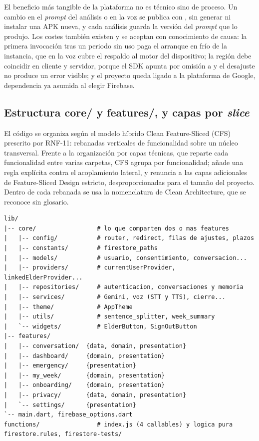 El beneficio más tangible de la plataforma no es técnico sino de proceso. Un cambio en el \emph{prompt} del
análisis o en la voz se publica con , sin generar ni instalar una APK nueva, y cada
análisis guarda la versión del \emph{prompt} que lo produjo. Los costes también existen y se aceptan con
conocimiento de causa: la primera invocación tras un periodo sin uso paga el arranque en frío de la
instancia, que en la voz cubre el respaldo al motor del dispositivo; la región debe coincidir en cliente y
servidor, porque el SDK apunta por omisión a  y el desajuste no produce un error visible;
y el proyecto queda ligado a la plataforma de Google, dependencia ya asumida al elegir Firebase.

\subsection{Estructura core/ y features/, y capas por \emph{slice}}

El código se organiza según el modelo híbrido Clean Feature-Sliced (CFS) prescrito por RNF-11: rebanadas
verticales de funcionalidad sobre un núcleo transversal. Frente a la organización por capas técnicas, que
reparte cada funcionalidad entre varias carpetas, CFS agrupa por funcionalidad; añade una regla explícita
contra el acoplamiento lateral, y renuncia a las capas adicionales de Feature-Sliced Design estricto,
desproporcionadas para el tamaño del proyecto. Dentro de cada rebanada se usa la nomenclatura de Clean
Architecture, que se reconoce sin glosario.

\begin{lstlisting}[style=Consola, float=tbp, caption={Estructura real del árbol de código fuente.}, label={lst:arbol}]
lib/
|-- core/                 # lo que comparten dos o mas features
|   |-- config/           # router, redirect, filas de ajustes, plazos
|   |-- constants/        # firestore_paths
|   |-- models/           # usuario, consentimiento, conversacion...
|   |-- providers/        # currentUserProvider, linkedElderProvider...
|   |-- repositories/     # autenticacion, conversaciones y memoria
|   |-- services/         # Gemini, voz (STT y TTS), cierre...
|   |-- theme/            # AppTheme
|   |-- utils/            # sentence_splitter, week_summary
|   `-- widgets/          # ElderButton, SignOutButton
|-- features/
|   |-- conversation/  {data, domain, presentation}
|   |-- dashboard/     {domain, presentation}
|   |-- emergency/     {presentation}
|   |-- my_week/       {domain, presentation}
|   |-- onboarding/    {domain, presentation}
|   |-- privacy/       {data, domain, presentation}
|   `-- settings/      {presentation}
`-- main.dart, firebase_options.dart
functions/                # index.js (4 callables) y logica pura
firestore.rules, firestore-tests/
\end{lstlisting}

